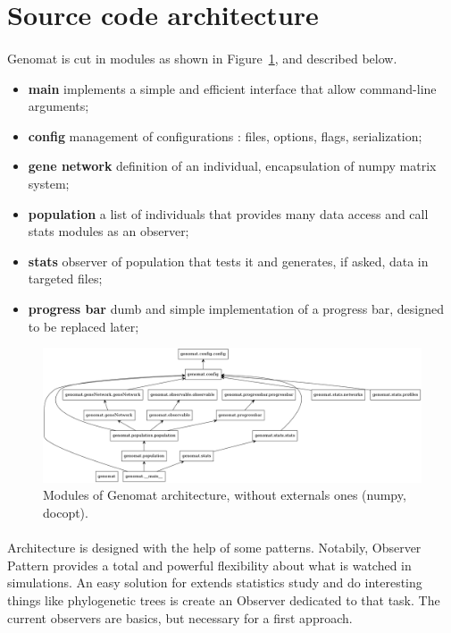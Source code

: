 \documentclass[]{report} %
\begin{document}
\section*{Source code architecture}
	\paragraph*{}
        Genomat is cut in modules as shown in Figure~\ref{fig:umldiag}, and described below.
        \begin{itemize}
                \item \textbf{main} implements a simple and efficient interface that allow command-line arguments;
                \item \textbf{config} management of configurations : files, options, flags, serialization;
                \item \textbf{gene network} definition of an individual, encapsulation of numpy matrix system;
                \item \textbf{population} a list of individuals that provides many data access and call stats modules as an observer;
                \item \textbf{stats} observer of population that tests it and generates, if asked, data in targeted files;
                \item \textbf{progress bar} dumb and simple implementation of a progress bar, designed to be replaced later;
        \end{itemize}

        \begin{figure}[H] 
                \centering
                \includegraphics[width=\textwidth]{packages_genomat.png}
                \caption{\footnotesize Modules of Genomat architecture, without externals ones (numpy, docopt).}
                \label{fig:umldiag}
        \end{figure}

	\paragraph*{}
        Architecture is designed with the help of some patterns. 
        Notabily, Observer Pattern provides a total and powerful flexibility about what is watched in simulations.
        An easy solution for extends statistics study and do interesting things like phylogenetic trees is create an Observer dedicated to that task.
        The current observers are basics, but necessary for a first approach.
\end{document}
